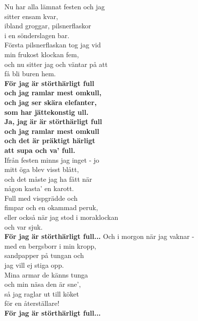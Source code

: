 \documentclass[a6paper,10pt]{article}
\begin{document}
\small %
\setlength{\oddsidemargin}{-0.47in}
\begin{center}
\end{center}
\begin{lyrics}
Nu har alla lämnat festen och jag \\
sitter ensam kvar,\\
ibland groggar, pilsnerflaskor\\
i en sönderslagen bar.\\
Första pilsnerflaskan tog jag vid\\
min frukost klockan fem,\\
och nu sitter jag och väntar på att\\
få bli buren hem.
\vspace{5pt}\\
\textbf{För jag är störthärligt full\\
och jag ramlar mest omkull,\\
och jag ser skära elefanter,\\
som har jättekonstig ull.\\
Ja, jag är är störthärligt full\\
och jag ramlar mest omkull\\
och det är präktigt härligt\\
att supa och va' full.}
\vspace{5pt}\\
Ifrån festen minns jag inget - jo\\
mitt öga blev visst blått,\\
och det måste jag ha fått när\\
någon kasta' en karott.\\
Full med vispgrädde och\\
fimpar och en okammad peruk,\\
eller också när jag stod i moraklockan\\
och var sjuk.
\vspace{5pt}\\
\textbf{För jag är störthärligt full...}
\setlength{\oddsidemargin}{-0.37in}
\noindent
Och i morgon när jag vaknar -\\
med en bergsborr i min kropp,\\
sandpapper på tungan och\\
jag vill ej stiga opp.\\
Mina armar de känns tunga\\
och min näsa den är sne',\\
så jag raglar ut till köket\\
för en återställare!
\vspace{5pt}\\
\textbf{För jag är störthärligt full...}
\end{lyrics}
\end{document}
